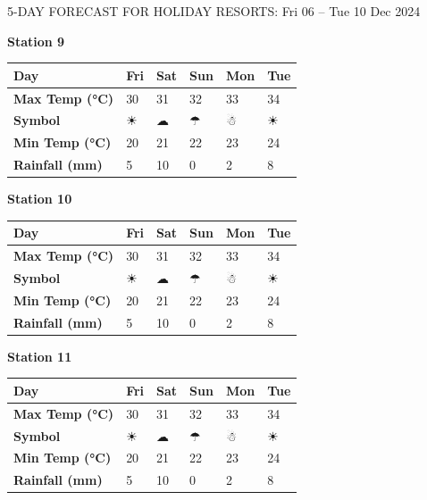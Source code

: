     \begin{frame}{5-DAY FORECAST FOR HOLIDAY RESORTS: Fri 06 – Tue 10 Dec 2024}
    \scriptsize
    
        \textbf{Station 9} \\
        \renewcommand{\arraystretch}{1.2} %
        \begin{tabular}{|p{2cm}|p{1.8cm}|p{1.8cm}|p{1.8cm}|p{1.8cm}|p{1.8cm}|}
        \hline
        \textbf{Day} & Fri & Sat & Sun & Mon & Tue \\ \hline
\textbf{Max Temp (°C)} & 30 & 31 & 32 & 33 & 34 \\ \hline
\textbf{Symbol} & ☀ & ☁ & ☂ & ☃ & ☀ \\ \hline
\textbf{Min Temp (°C)} & 20 & 21 & 22 & 23 & 24 \\ \hline
\textbf{Rainfall (mm)} & 5 & 10 & 0 & 2 & 8 \\ \hline
        \end{tabular}
        \vspace{0.5cm} %
        
        \textbf{Station 10} \\
        \renewcommand{\arraystretch}{1.2} %
        \begin{tabular}{|p{2cm}|p{1.8cm}|p{1.8cm}|p{1.8cm}|p{1.8cm}|p{1.8cm}|}
        \hline
        \textbf{Day} & Fri & Sat & Sun & Mon & Tue \\ \hline
\textbf{Max Temp (°C)} & 30 & 31 & 32 & 33 & 34 \\ \hline
\textbf{Symbol} & ☀ & ☁ & ☂ & ☃ & ☀ \\ \hline
\textbf{Min Temp (°C)} & 20 & 21 & 22 & 23 & 24 \\ \hline
\textbf{Rainfall (mm)} & 5 & 10 & 0 & 2 & 8 \\ \hline
        \end{tabular}
        \vspace{0.5cm} %
        
        \textbf{Station 11} \\
        \renewcommand{\arraystretch}{1.2} %
        \begin{tabular}{|p{2cm}|p{1.8cm}|p{1.8cm}|p{1.8cm}|p{1.8cm}|p{1.8cm}|}
        \hline
        \textbf{Day} & Fri & Sat & Sun & Mon & Tue \\ \hline
\textbf{Max Temp (°C)} & 30 & 31 & 32 & 33 & 34 \\ \hline
\textbf{Symbol} & ☀ & ☁ & ☂ & ☃ & ☀ \\ \hline
\textbf{Min Temp (°C)} & 20 & 21 & 22 & 23 & 24 \\ \hline
\textbf{Rainfall (mm)} & 5 & 10 & 0 & 2 & 8 \\ \hline
        \end{tabular}
        \vspace{0.5cm} %
        

\end{frame}
